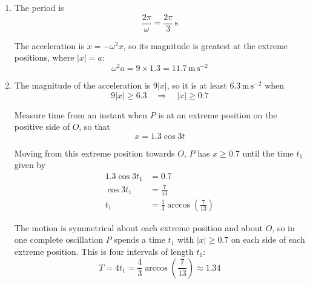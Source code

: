 \documentclass[leqno]{article}
\begin{document}
\begin{enumerate}[
  label=\textbf{\arabic*.},
  leftmargin=*,
  topsep=0pt,
  partopsep=0pt,
  parsep=0pt
]
\begin{djsSolution}
\begin{enumerate}[label=\textbf{(\alph*)}, start=1]
Subtracting the second equation from the first:
\begin{align*}
10.71&=\omega^2\left(1.44-0.25\right)\\
10.71&=1.19\,\omega^2\\
\omega^2&=9
\end{align*}

so \(\omega=3\). Substituting into the first equation:
\begin{align*}
12.96&=9\left(a^2-0.25\right)\\
a^2-0.25&=1.44\\
a^2&=1.69
\end{align*}

Since \(a>0\), \(a=1.3\), as required.

\item The period is
\[
\frac{2\pi}{\omega}=\frac{2\pi}{3}\,\mathrm{s}
\]

The acceleration is \(\ddot{x}=-\omega^2x\), so its magnitude is greatest at the extreme positions, where \(|x|=a\):
\[
\omega^2a=9\times1.3=11.7\,\mathrm{m\,s^{-2}}
\]

\item The magnitude of the acceleration is \(9|x|\), so it is at least \(6.3\,\mathrm{m\,s^{-2}}\) when
\[
9|x|\ge 6.3\quad\Longrightarrow\quad |x|\ge 0.7
\]

Measure time from an instant when \(P\) is at an extreme position on the positive side of \(O\), so that
\[
x=1.3\cos 3t
\]

Moving from this extreme position towards \(O\), \(P\) has \(x\ge 0.7\) until the time \(t_1\) given by
\begin{align*}
1.3\cos 3t_1&=0.7\\
\cos 3t_1&=\frac{7}{13}\\
t_1&=\frac{1}{3}\arccos\left(\frac{7}{13}\right)
\end{align*}

The motion is symmetrical about each extreme position and about \(O\), so in one complete oscillation \(P\) spends a time \(t_1\) with \(|x|\ge0.7\) on each side of each extreme position. This is four intervals of length \(t_1\):
\[
T=4t_1=\frac{4}{3}\arccos\left(\frac{7}{13}\right)\approx 1.34
\]

\end{enumerate}
\end{djsSolution}

\newpage

\questionitem


\end{enumerate}
\end{document}

